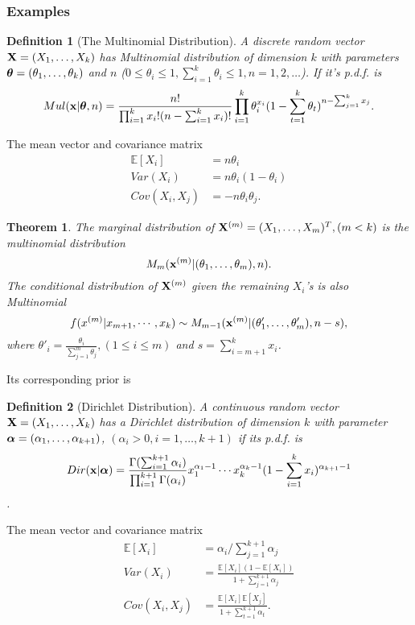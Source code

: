 \documentclass[11pt]{article}
\def\X{{\bf X}}
\def\x{{\bf x}}
\def\BE{{\mathbb E}}
\def\tha{\mbox{\boldmath$\theta$\unboldmath}}
\def\aph{\mbox{\boldmath$\alpha$\unboldmath}}
\newtheorem{theorem}{Theorem}[section]
\newtheorem{definition}{Definition}[section]
\begin{document}
\subsubsection{Examples}
\begin{definition} [The Multinomial Distribution]
	A discrete random vector $\X = (X_1,\dots,X_k)$ has Multinomial distribution of dimension $k$ with parameters $\tha=(\theta_1,\dots,\theta_k)$ and $n$ ($0\leq \theta_i \leq 1, \sum_{i=1}^{k}\theta_i \leq1, n=1,2,\dots$).
	If it's p.d.f. is 
		\begin{equation}
			Mul(\x|\tha,n) = \frac{n!}{\prod_{i=1}^k x_i!(n-\sum_{i=1}^k x_i)!}\prod_{i=1}^k \theta_i^{x_i} (1-\sum_{t=1}^k\theta_t)^{n-\sum_{j=1}^kx_j}.
		\end{equation}
\end{definition}
The mean vector and covariance matrix
	\begin{align}
		\BE[X_i] &= n\theta_i\\
		Var(X_i) &= n\theta_i(1-\theta_i)\\
		Cov(X_i,X_j) &= -n\theta_i\theta_j.
	\end{align}

\begin{theorem}
	The marginal distribution of $\X^{(m)}=(X_1,\dots,X_m)^T, (m<k)$ is the multinomial distribution
		$$M_m(\x^{(m)}|(\theta_1,\dots,\theta_m),n).$$
	The conditional distribution of $\X^{(m)}$ given the remaining $X_i$'s is also Multinomial 
		$$f(x^{(m)}|x_{m+1},\cdots,x_k)\sim M_{m-1}(\x^{(m)}|(\theta'_1,\dots, \theta'_m),n-s),$$
	where $\theta'_i = \frac{\theta_i}{\sum_{j=1}^{m}\theta_j}, (1\leq i\leq m)$ and $s=\sum_{i=m+1}^{k}x_i$.
\end{theorem}

Its corresponding prior is
\begin{definition} [Dirichlet Distribution]
	A continuous random vector $\X=(X_1,\dots,X_k)$ has a Dirichlet distribution of dimension $k$ with parameter $\aph=(\alpha_1,\dots, \alpha_{k+1})$, $(\alpha_i>0, i=1,\dots,k+1)$
	if its p.d.f. is 
		\begin{equation}
			Dir(\x|\aph) = \frac{\Gamma(\sum_{i=1}^{k+1}\alpha_i)}{\prod_{i=1}^{k+1}\Gamma(\alpha_i)}x_1^{\alpha_1-1}\cdots x_k^{\alpha_k-1}(1-\sum_{i=1}^k x_i)^{\alpha_{k+1}-1}
		\end{equation}.
\end{definition}
The mean vector and covariance matrix
	\begin{align}
		\BE[X_i] &= \alpha_i/\sum_{j=1}^{k+1}\alpha_j\\
		Var(X_i) &= \frac{\BE[X_i](1-\BE[X_i])}{1+\sum_{j=1}^{k+1}\alpha_j}\\
		Cov(X_i,X_j) &= \frac{\BE[X_i]\BE[X_j]}{1+\sum_{t=1}^{k+1}\alpha_t}.
	\end{align}
\end{document}
